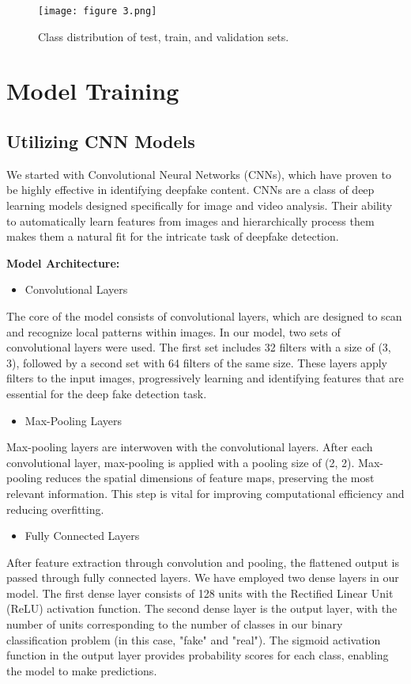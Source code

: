 \documentclass{article}
\begin{document}
\begin{figure}[h]
    \centering
    \texttt{[image: figure 3.png]}
    \caption{Class distribution of test, train, and validation sets. }
    \label{fig:enter-label}
\end{figure}

\section{Model Training}
\subsection{Utilizing CNN Models }
We started with Convolutional Neural Networks (CNNs), which have proven to be highly effective in identifying deepfake content. CNNs are a class of deep learning models designed specifically for image and video analysis. Their ability to automatically learn features from images and hierarchically process them makes them a natural fit for the intricate task of deepfake detection.

\textbf{Model Architecture:}

\begin{itemize}
    \item Convolutional Layers
\end{itemize}
The core of the model consists of convolutional layers, which are designed to scan and recognize local patterns within images. In our model, two sets of convolutional layers were used. The first set includes 32 filters with a size of (3, 3), followed by a second set with 64 filters of the same size. These layers apply filters to the input images, progressively learning and identifying features that are essential for the deep fake detection task.

\begin{itemize}
    \item Max-Pooling Layers
\end{itemize}
Max-pooling layers are interwoven with the convolutional layers. After each convolutional layer, max-pooling is applied with a pooling size of (2, 2). Max-pooling reduces the spatial dimensions of feature maps, preserving the most relevant information. This step is vital for improving computational efficiency and reducing overfitting.

\begin{itemize}
    \item Fully Connected Layers
\end{itemize}
After feature extraction through convolution and pooling, the flattened output is passed through fully connected layers. We have employed two dense layers in our model. The first dense layer consists of 128 units with the Rectified Linear Unit (ReLU) activation function. The second dense layer is the output layer, with the number of units corresponding to the number of classes in our binary classification problem (in this case, "fake" and "real"). The sigmoid activation function in the output layer provides probability scores for each class, enabling the model to make predictions.
\end{document}
